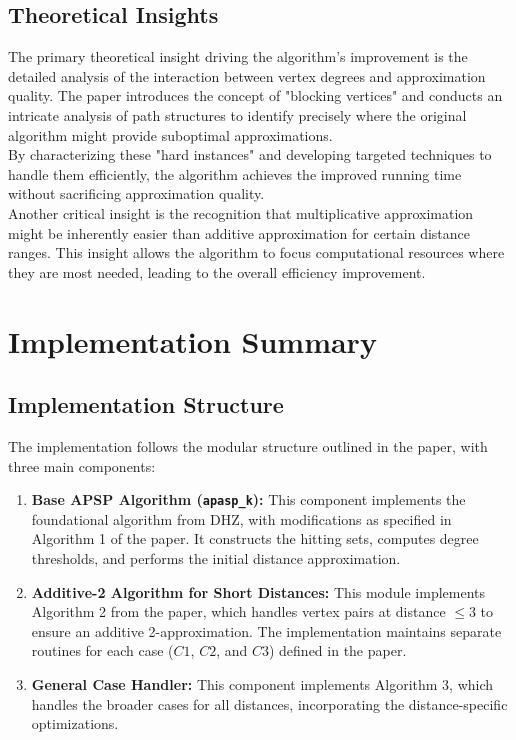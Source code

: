 \documentclass[a4paper,11pt,oneside]{book}
\begin{document}
\subsection{Theoretical Insights}

The primary theoretical insight driving the algorithm's improvement is the detailed analysis of the interaction between vertex degrees and approximation quality. The paper introduces the concept of "blocking vertices" and conducts an intricate analysis of path structures to identify precisely where the original algorithm might provide suboptimal approximations.\\

By characterizing these "hard instances" and developing targeted techniques to handle them efficiently, the algorithm achieves the improved running time without sacrificing approximation quality.\\

Another critical insight is the recognition that multiplicative approximation might be inherently easier than additive approximation for certain distance ranges. This insight allows the algorithm to focus computational resources where they are most needed, leading to the overall efficiency improvement.\\
\clearpage

\section{Implementation Summary}

\subsection{Implementation Structure}

The implementation follows the modular structure outlined in the paper, with three main components:\\

\begin{enumerate}
    \item \textbf{Base APSP Algorithm (\texttt{apasp\_k}):} This component implements the foundational algorithm from DHZ, with modifications as specified in Algorithm 1 of the paper. It constructs the hitting sets, computes degree thresholds, and performs the initial distance approximation.
    
    \item \textbf{Additive-2 Algorithm for Short Distances:} This module implements Algorithm 2 from the paper, which handles vertex pairs at distance $\leq 3$ to ensure an additive 2-approximation. The implementation maintains separate routines for each case ($C1$, $C2$, and $C3$) defined in the paper.
    
    \item \textbf{General Case Handler:} This component implements Algorithm 3, which handles the broader cases for all distances, incorporating the distance-specific optimizations.
\end{enumerate}
\end{document}
